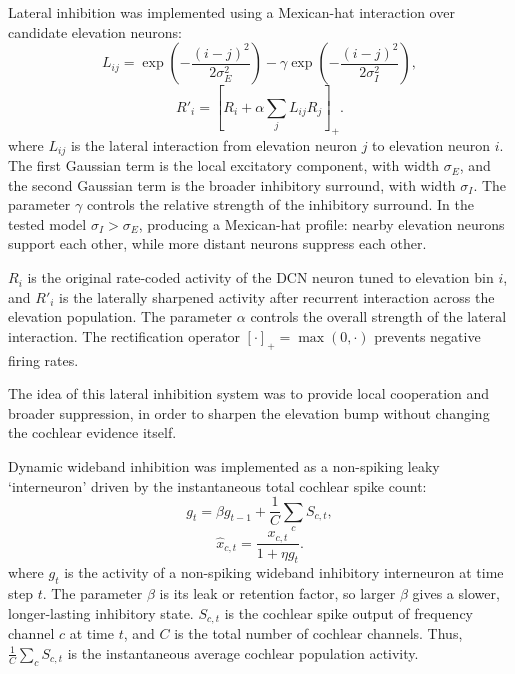 Lateral inhibition was implemented using a Mexican-hat interaction over candidate elevation neurons:
\begin{equation}
    L_{ij}
    =
    \exp
    \left(
        -
        \frac{(i-j)^2}{2\sigma_E^2}
    \right)
    -
    \gamma
    \exp
    \left(
        -
        \frac{(i-j)^2}{2\sigma_I^2}
    \right),
\end{equation}
\begin{equation}
    R'_i
    =
    \left[
        R_i + \alpha \sum_j L_{ij}R_j
    \right]_+.
\end{equation}
where $L_{ij}$ is the lateral interaction from elevation neuron $j$ to elevation neuron $i$. The first Gaussian term is the local excitatory component, with width
$\sigma_E$, and the second Gaussian term is the broader inhibitory surround, with width $\sigma_I$. The parameter $\gamma$ controls the relative strength of the inhibitory surround. In the tested model $\sigma_I > \sigma_E$, producing a Mexican-hat profile: nearby elevation neurons support each other, while more distant neurons suppress each other.

$R_i$ is the original rate-coded activity of the DCN neuron tuned to elevation bin $i$, and $R'_i$ is the laterally sharpened activity after recurrent
interaction across the elevation population. The parameter $\alpha$ controls the
overall strength of the lateral interaction. The rectification operator
$[\cdot]_+ = \max(0,\cdot)$ prevents negative firing rates.

The idea of this lateral inhibition system was to provide local cooperation and broader suppression, in order to sharpen the elevation bump without changing the cochlear evidence itself.

Dynamic wideband inhibition was implemented as a non-spiking leaky `interneuron' driven by the instantaneous total cochlear spike count:
\begin{equation}
    g_t
    =
    \beta g_{t-1}
    +
    \frac{1}{C}
    \sum_c S_{c,t},
\end{equation}
\begin{equation}
    \hat{x}_{c,t}
    =
    \frac{
        x_{c,t}
    }{
        1+\eta g_t
    }.
\end{equation}
where $g_t$ is the activity of a non-spiking wideband inhibitory interneuron at
time step $t$. The parameter $\beta$ is its leak or retention factor, so larger
$\beta$ gives a slower, longer-lasting inhibitory state. $S_{c,t}$ is the
cochlear spike output of frequency channel $c$ at time $t$, and $C$ is the total
number of cochlear channels. Thus, $\frac{1}{C}\sum_c S_{c,t}$ is the
instantaneous average cochlear population activity.

